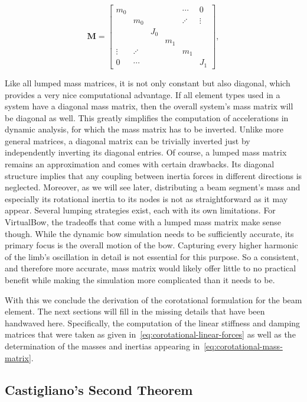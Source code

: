 \begin{equation}
\boldsymbol{M} = \begin{bmatrix}
m_0 & & & & \cdots & 0 \\
& m_0 & & & \iddots & \vdots\\
& & J_0 & & & \\
& & & m_1 & & \\
\vdots & \iddots & & & m_1 & \\
0 & \cdots & & & & J_1
\end{bmatrix},  \label{eq:corotational-mass-matrix}
\end{equation}

Like all lumped mass matrices, it is not only constant but also diagonal, which provides a very nice computational advantage.
If all element types used in a system have a diagonal mass matrix, then the overall system's mass matrix will be diagonal as well.
This greatly simplifies the computation of accelerations in dynamic analysis, for which the mass matrix has to be inverted.
Unlike more general matrices, a diagonal matrix can be trivially inverted just by independently inverting its diagonal entries.
Of course, a lumped mass matrix remains an approximation and comes with certain drawbacks.
Its diagonal structure implies that any coupling between inertia forces in different directions is neglected.
Moreover, as we will see later, distributing a beam segment's mass and especially its rotational inertia to its nodes is not as straightforward as it may appear.
Several lumping strategies exist, each with its own limitations.
For VirtualBow, the tradeoffs that come with a lumped mass matrix make sense though.
While the dynamic bow simulation needs to be sufficiently accurate, its primary focus is the overall motion of the bow.
Capturing every higher harmonic of the limb's oscillation in detail is not essential for this purpose.
So a consistent, and therefore more accurate, mass matrix would likely offer little to no practical benefit while making the simulation more complicated than it needs to be.

With this we conclude the derivation of the corotational formulation for the beam element.
The next sections will fill in the missing details that have been handwaved here.
Specifically, the computation of the linear stiffness and damping matrices that were taken as given in~\eqref{eq:corotational-linear-forces} as well as the determination of the masses and inertias appearing in~\eqref{eq:corotational-mass-matrix}.

\newpage
\subsection{Castigliano's Second Theorem}


